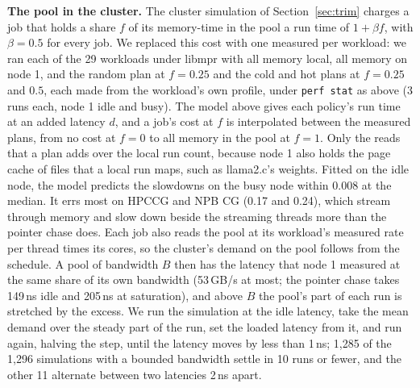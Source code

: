 \documentclass[11pt]{article}
\newcommand{\secref}[1]{Section~\ref{#1}}
\newcommand{\tabref}[1]{Table~\ref{#1}}
\begin{document}
\textbf{The pool in the cluster.} The cluster simulation of \secref{sec:trim} charges a job that holds a share $f$ of
its memory-time in the pool a run time of $1 + \beta f$, with $\beta = 0.5$ for every job. We replaced this cost with
one measured per workload: we ran each of the 29 workloads under libmpr with all memory local, all memory on node 1,
and the random plan at $f = 0.25$ and the cold and hot plans at $f = 0.25$ and $0.5$, each made from the workload's own
profile, under \texttt{perf stat} as above (3 runs each, node 1 idle and busy). The model above gives each policy's
run time at an added latency $d$, and a job's cost at $f$ is interpolated between the measured plans, from no cost
at $f = 0$ to all memory in the pool at $f = 1$. Only the reads that a plan adds over the local run count, because
node 1 also holds the page cache of files that a local run maps, such as llama2.c's weights. Fitted on the idle
node, the model predicts the slowdowns on the busy node within 0.008 at the median. It errs most on HPCCG and NPB CG
(0.17 and 0.24), which stream through memory and slow down beside the streaming threads more than the pointer chase
does. Each job also reads the pool at its workload's measured rate per thread times its cores, so the cluster's
demand on the pool follows from the schedule. A pool of bandwidth $B$ then has the latency that node 1 measured at
the same share of its own bandwidth (53\,GB/s at most; the pointer chase takes 149\,ns idle and 205\,ns at
saturation), and above $B$ the pool's part of each run is stretched by the excess. We run the simulation at the idle
latency, take the mean demand over the steady part of the run, set the loaded latency from it, and run again, halving
the step, until the latency moves by less than 1\,ns; 1{,}285 of the 1{,}296 simulations with a bounded bandwidth
settle in 10 runs or fewer, and the other 11 alternate between two latencies 2\,ns apart.

\begin{table}[t]
\centering
\small
\caption{Cluster simulation with a slower pool (the setup of \tabref{tab:trim-grid}, load 0.8, 32 nodes of 128\,GB
and a 1{,}024\,GB pool of 64\,GB/s): throughput in jobs per hour, mean of 3 seeds, with the flat cost $\beta = 0.5$
and with each workload's modelled cost at the pool's idle added latency over local memory in ns, when the pool holds
the job's coldest, a random or its hottest memory. The standard deviation over seeds is about 0.8 jobs per hour.}
\label{tab:cxl-grid}
\setlength{\tabcolsep}{4pt}

\end{table}
\end{document}
